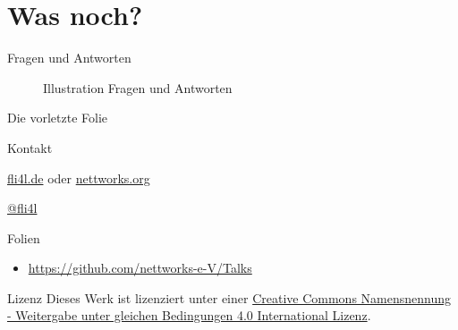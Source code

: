 \documentclass[t]{beamer}
\begin{document}
\section*{Was noch?}

\begin{frame}{Fragen und Antworten}
    \begin{figure}
        
        \caption{Illustration Fragen und Antworten}
    \end{figure}
\end{frame}

\begin{frame}{Die vorletzte Folie}
    \begin{figure}
        
    \end{figure}
    \begin{block}{Kontakt}
        \begin{description}[Twitter]
            \item [WWW] \href{https://www.fli4l.de/}{fli4l.de} oder
                    \href{https://www.nettworks.org/}{nettworks.org}
            \item [Twitter] \href{https://twitter.com/fli4l}{@fli4l}
        \end{description}
    \end{block}
    \begin{block}{Folien}
        \begin{itemize}
            \item \url{https://github.com/nettworks-e-V/Talks}
        \end{itemize}
    \end{block}
    \begin{block}{Lizenz}
        \small{%
            Dieses Werk ist lizenziert unter einer
            \href{http://creativecommons.org/licenses/by-sa/4.0/}{Creative Commons
            Namensnennung - Weitergabe unter gleichen Bedingungen 4.0 International
            Lizenz}.
        }
    \end{block}
\end{frame}

\end{document}
